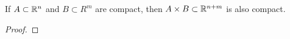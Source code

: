 \documentclass[../main.tex]{subfiles}
\begin{document}
\begin{theorem}\label{trm:18.47}
    If $A\subset\mathbb{R}^n$ and $B\subset R^m$ are compact, then $A\times B\subset\mathbb{R}^{n+m}$ is also compact.
    \begin{proof}

\end{proof}
\end{theorem}
\end{document}

